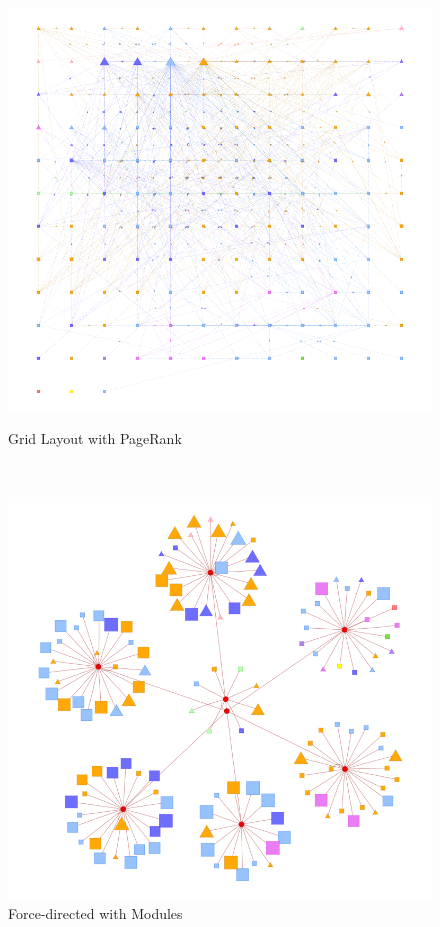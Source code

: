 \begin{figure}[tp]

  \begin{minipage}{0.5\textwidth}
    \centering
    \includegraphics[width=\textwidth]{img/regexp/grid.png}
    \caption{Grid Layout with PageRank}\label{fig:regexp:grid}
  \end{minipage}~%
  \begin{minipage}{0.5\textwidth}
    \centering
    \includegraphics[width=\textwidth]{img/regexp/module.png}
    \caption{Force-directed with Modules}\label{fig:regexp:module}
  \end{minipage}
\end{figure}

